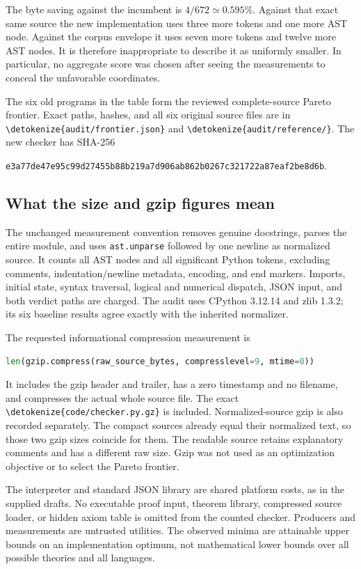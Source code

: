 \documentclass[11pt,letterpaper]{article}
\theoremstyle{definition}\newtheorem{definition}[theorem]{Definition}
\theoremstyle{remark}\newtheorem{remark}[theorem]{Remark}
\newcommand{\file}[1]{\expandafter\nolinkurl\expandafter{\detokenize{#1}}}
\begin{document}
The byte saving against the incumbent is $4/672\simeq0.595\%$.
Against that exact same source the new implementation uses three more
tokens and one more AST node. Against the corpus envelope it uses seven
more tokens and twelve more AST nodes. It is therefore inappropriate to
describe it as uniformly smaller. In particular, no aggregate score was
chosen after seeing the measurements to conceal the unfavorable coordinates.

The six old programs in the table form the reviewed complete-source
Pareto frontier. Exact paths, hashes, and all six original source files
are in \file{audit/frontier.json} and \file{audit/reference/}. The
new checker has SHA-256
\begin{center}\scriptsize\texttt{e3a77de47e95c99d27455b88b219a7d906ab862b0267c321722a87eaf2be8d6b}.
\end{center}

\subsection{What the size and gzip figures mean}

The unchanged measurement convention removes genuine docstrings,
parses the entire module, and uses \texttt{ast.unparse} followed by one
newline as normalized source. It counts all AST nodes and all significant
Python tokens, excluding comments, indentation/newline metadata, encoding,
and end markers. Imports, initial state, syntax traversal, logical and
numerical dispatch, JSON input, and both verdict paths are charged.
The audit uses CPython 3.12.14 and zlib 1.3.2; its six baseline results
agree exactly with the inherited normalizer.

The requested informational compression measurement is
\begin{lstlisting}[language=Python]
len(gzip.compress(raw_source_bytes, compresslevel=9, mtime=0))
\end{lstlisting}
It includes the gzip header and trailer, has a zero timestamp and no
filename, and compresses the actual whole source file. The exact
\file{code/checker.py.gz} is included. Normalized-source gzip is also
recorded separately. The compact sources already equal their normalized
text, so those two gzip sizes coincide for them. The readable source
retains explanatory comments and has a different raw size. Gzip was not
used as an optimization objective or to select the Pareto frontier.

The interpreter and standard JSON library are shared platform costs,
as in the supplied drafts. No executable proof input, theorem library,
compressed source loader, or hidden axiom table is omitted from the
counted checker. Producers and measurements are untrusted utilities.
The observed minima are attainable upper bounds on an implementation
optimum, not mathematical lower bounds over all possible theories and
all languages.
\end{document}
